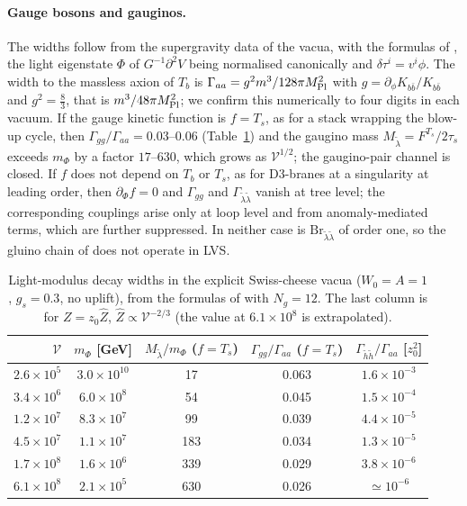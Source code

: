 \documentclass[11pt]{article}
\newcommand{\Mpl}{M_{\rm Pl}}
\newcommand{\vol}{\mathcal{V}}
\begin{document}
\paragraph*{Gauge bosons and gauginos.} The widths follow from the supergravity data of the vacua, with the formulas of \cite{KW}, the light eigenstate $\Phi$ of $G^{-1}\partial^2V$ being normalised canonically and $\delta\tau^i=v^i\phi$. The width to the massless axion of $T_b$ is $\Gamma_{aa}=g^2m^3/128\pi\Mpl^2$ with $g=\partial_\phi K_{b\bar b}/K_{b\bar b}$ and $g^2=\tfrac83$, that is $m^3/48\pi\Mpl^2$; we confirm this numerically to four digits in each vacuum. If the gauge kinetic function is $f=T_s$, as for a stack wrapping the blow-up cycle, then $\Gamma_{gg}/\Gamma_{aa}=0.03$--$0.06$ (Table~\ref{tab:br}) and the gaugino mass $M_{\tilde\lambda}=F^{T_s}/2\tau_s$ exceeds $m_\Phi$ by a factor $17$--$630$, which grows as $\vol^{1/2}$; the gaugino-pair channel is closed. If $f$ does not depend on $T_b$ or $T_s$, as for D3-branes at a singularity at leading order, then $\partial_\Phi f=0$ and $\Gamma_{gg}$ and $\Gamma_{\tilde\lambda\tilde\lambda}$ vanish at tree level; the corresponding couplings arise only at loop level and from anomaly-mediated terms, which are further suppressed. In neither case is $\mathrm{Br}_{\tilde\lambda\tilde\lambda}$ of order one, so the gluino chain of \cite{KW} does not operate in LVS.

\begin{table}[h]\centering
\begin{tabular}{rcccc}\toprule
$\vol$ & $m_\Phi$ [GeV] & $M_{\tilde\lambda}/m_\Phi$ ($f=T_s$) & $\Gamma_{gg}/\Gamma_{aa}$ ($f=T_s$) & $\Gamma_{\tilde h\tilde h}/\Gamma_{aa}$ [$z_0^2$]\\ \midrule
$2.6\times10^{5}$ & $3.0\times10^{10}$ & 17 & 0.063 & $1.6\times10^{-3}$\\
$3.4\times10^{6}$ & $6.0\times10^{8}$ & 54 & 0.045 & $1.5\times10^{-4}$\\
$1.2\times10^{7}$ & $8.3\times10^{7}$ & 99 & 0.039 & $4.4\times10^{-5}$\\
$4.5\times10^{7}$ & $1.1\times10^{7}$ & 183 & 0.034 & $1.3\times10^{-5}$\\
$1.7\times10^{8}$ & $1.6\times10^{6}$ & 339 & 0.029 & $3.8\times10^{-6}$\\
$6.1\times10^{8}$ & $2.1\times10^{5}$ & 630 & 0.026 & $\simeq10^{-6}$\\ \bottomrule
\end{tabular}
\caption{Light-modulus decay widths in the explicit Swiss-cheese vacua ($W_0=A=1$, $g_s=0.3$, no uplift), from the formulas of \cite{KW} with $N_g=12$. The last column is for $Z=z_0\hat Z$, $\hat Z\propto\vol^{-2/3}$ (the value at $6.1\times10^8$ is extrapolated).}\label{tab:br}\end{table}
\end{document}
